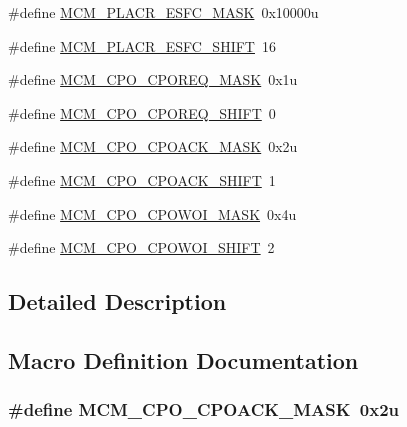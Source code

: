 \begin{DoxyCompactItemize}
\item 
\#define \hyperlink{group___m_c_m___register___masks_gadfd414b0c13cb1d199238e5a312a153d}{M\+C\+M\+\_\+\+P\+L\+A\+C\+R\+\_\+\+E\+S\+F\+C\+\_\+\+M\+A\+SK}~0x10000u
\item 
\#define \hyperlink{group___m_c_m___register___masks_gae370a0400b2ce8cef0416ee11b9898f8}{M\+C\+M\+\_\+\+P\+L\+A\+C\+R\+\_\+\+E\+S\+F\+C\+\_\+\+S\+H\+I\+FT}~16
\item 
\#define \hyperlink{group___m_c_m___register___masks_ga36f43d6467fbe16e5585829747471da9}{M\+C\+M\+\_\+\+C\+P\+O\+\_\+\+C\+P\+O\+R\+E\+Q\+\_\+\+M\+A\+SK}~0x1u
\item 
\#define \hyperlink{group___m_c_m___register___masks_ga4787ad168d88290f8da659a6b30e243d}{M\+C\+M\+\_\+\+C\+P\+O\+\_\+\+C\+P\+O\+R\+E\+Q\+\_\+\+S\+H\+I\+FT}~0
\item 
\#define \hyperlink{group___m_c_m___register___masks_ga039f47e9952c17908e79eace8fd0139c}{M\+C\+M\+\_\+\+C\+P\+O\+\_\+\+C\+P\+O\+A\+C\+K\+\_\+\+M\+A\+SK}~0x2u
\item 
\#define \hyperlink{group___m_c_m___register___masks_gaa9a8977b3a452ae07fb7ca851c5ee47e}{M\+C\+M\+\_\+\+C\+P\+O\+\_\+\+C\+P\+O\+A\+C\+K\+\_\+\+S\+H\+I\+FT}~1
\item 
\#define \hyperlink{group___m_c_m___register___masks_ga154f71ae507ca3bac1e2c2a9dbd1dcd5}{M\+C\+M\+\_\+\+C\+P\+O\+\_\+\+C\+P\+O\+W\+O\+I\+\_\+\+M\+A\+SK}~0x4u
\item 
\#define \hyperlink{group___m_c_m___register___masks_ga369c1ed9bf00d8317ea868b2ea1b0572}{M\+C\+M\+\_\+\+C\+P\+O\+\_\+\+C\+P\+O\+W\+O\+I\+\_\+\+S\+H\+I\+FT}~2
\end{DoxyCompactItemize}


\subsection{Detailed Description}


\subsection{Macro Definition Documentation}
\subsubsection[{\texorpdfstring{M\+C\+M\+\_\+\+C\+P\+O\+\_\+\+C\+P\+O\+A\+C\+K\+\_\+\+M\+A\+SK}{MCM_CPO_CPOACK_MASK}}]{\setlength{\rightskip}{0pt plus 5cm}\#define M\+C\+M\+\_\+\+C\+P\+O\+\_\+\+C\+P\+O\+A\+C\+K\+\_\+\+M\+A\+SK~0x2u}\hypertarget{group___m_c_m___register___masks_ga039f47e9952c17908e79eace8fd0139c}{}\label{group___m_c_m___register___masks_ga039f47e9952c17908e79eace8fd0139c}


